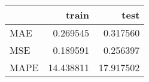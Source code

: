 \begin{tabular}{lrr}
\toprule
{} &      train &       test \\
\midrule
MAE  &   0.269545 &   0.317560 \\
MSE  &   0.189591 &   0.256397 \\
MAPE &  14.438811 &  17.917502 \\
\bottomrule
\end{tabular}

